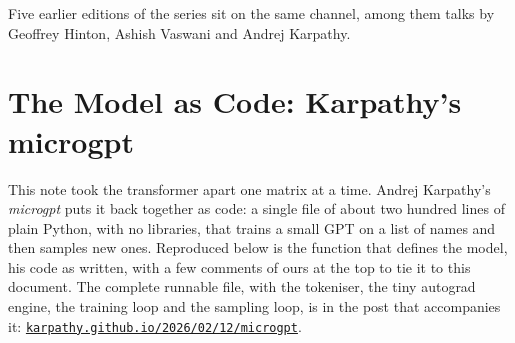 \documentclass[11pt]{article}
\begin{document}

\bigskip

\noindent Five earlier editions of the series sit on the same channel, among them talks by Geoffrey Hinton, Ashish Vaswani and Andrej Karpathy.

\newpage
\section{The Model as Code: Karpathy's microgpt}


This note took the transformer apart one matrix at a time. Andrej Karpathy's \textit{microgpt} puts it back together as code: a single file of about two hundred lines of plain Python, with no libraries, that trains a small GPT on a list of names and then samples new ones. Reproduced below is the function that defines the model, his code as written, with a few comments of ours at the top to tie it to this document. The complete runnable file, with the tokeniser, the tiny autograd engine, the training loop and the sampling loop, is in the post that accompanies it: \href{https://karpathy.github.io/2026/02/12/microgpt/}{\textcolor{measink}{\nolinkurl{karpathy.github.io/2026/02/12/microgpt}}}.


\end{document}
